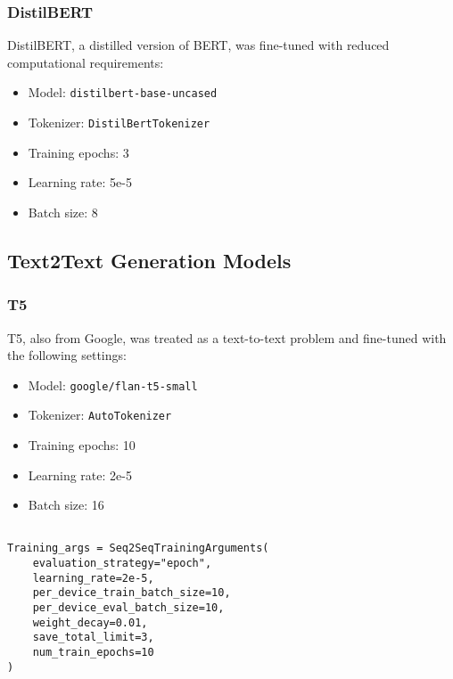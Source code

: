 \documentclass[conference]{IEEEtran}
\begin{document}
        \subsubsection{DistilBERT}

            DistilBERT, a distilled version of BERT, was fine-tuned with reduced computational requirements:
            \begin{itemize}
                \item Model: \texttt{distilbert-base-uncased}
                \item Tokenizer: \texttt{DistilBertTokenizer}
                \item Training epochs: 3
                \item Learning rate: 5e-5
                \item Batch size: 8
            \end{itemize}

    \subsection{Text2Text Generation Models}

        \subsubsection{T5}

            T5, also from Google, was treated as a text-to-text problem and fine-tuned with the following settings:
            \begin{itemize}
                \item Model: \texttt{google/flan-t5-small}
                \item Tokenizer: \texttt{AutoTokenizer}
                \item Training epochs: 10
                \item Learning rate: 2e-5
                \item Batch size: 16
            \end{itemize}

\begin{mdframed}[linewidth=1pt, innerleftmargin=15pt, innerrightmargin=15pt, innertopmargin=15pt, innerbottommargin=15pt]
\small
\begin{verbatim}

Training_args = Seq2SeqTrainingArguments(
    evaluation_strategy="epoch",
    learning_rate=2e-5,
    per_device_train_batch_size=10,
    per_device_eval_batch_size=10,
    weight_decay=0.01,
    save_total_limit=3,
    num_train_epochs=10
)
\end{verbatim}
\end{mdframed}
\end{document}
